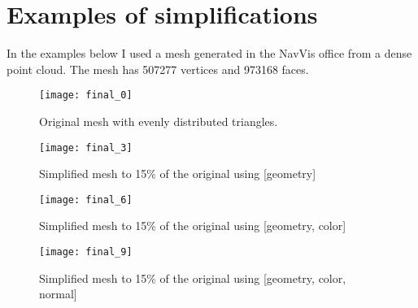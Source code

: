 \chapter{Examples of simplifications}
\thispagestyle{empty}%

In the examples below I used a mesh generated in the NavVis office from a dense point cloud. The mesh has 507277 vertices and 973168 faces.

\begin{sidewaysfigure}[ht]
    \texttt{[image: final\_0]}
    \caption{Original mesh with evenly distributed triangles.}
    \label{fig:final_0}
\end{sidewaysfigure}

\newpage
\begin{sidewaysfigure}[ht]
    \texttt{[image: final\_3]}
    \caption{Simplified mesh to 15\% of the original using [geometry]}
    \label{fig:final_3}
\end{sidewaysfigure}

\newpage
\begin{sidewaysfigure}[ht]
    \texttt{[image: final\_6]}
    \caption{Simplified mesh to 15\% of the original using [geometry, color]}
    \label{fig:final_6}
\end{sidewaysfigure}

\newpage
\begin{sidewaysfigure}[ht]
    \texttt{[image: final\_9]}
    \caption{Simplified mesh to 15\% of the original using [geometry, color, normal]}
    \label{fig:final_9}
\end{sidewaysfigure}